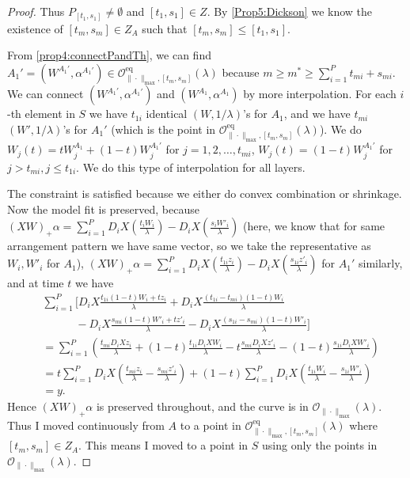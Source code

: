 \documentclass{article}
\newcommand{\eq}{\mathrm{eq}}      %
\begin{document}
\begin{proof}
Thus $P_{[t_1,s_1]} \neq \emptyset$ and $[t_1, s_1] \in Z$. By \cref{Prop5:Dickson} we know the existence of $[t_m, s_m] \in Z_A$ such that $[t_m, s_m] \leq [t_1, s_1]$. 

From \cref{prop4:connectPandTh}, we can find $A_1' = (W^{A_1'}, \alpha^{A_1'}) \in \mathcal{O}_{\|\cdot\|_{\max}, [t_m, s_m]}^{\eq}(\lambda)$ because $m \geq m^* \geq \sum_{i=1}^{P} t_{mi} + s_{mi}$. We can connect $(W^{A_1'},\alpha^{A_1'})$ and $(W^{A_1},\alpha^{A_1})$ by more interpolation.
For each $i$-th element in $S$ we have $t_{1i}$ identical $(W, 1/\lambda)$'s for $A_1$, and we have $t_{mi}$ $(W', 1/\lambda)$'s for $A_1'$ (which is the point in $\mathcal{O}_{\|\cdot\|_{\max}, [t_m, s_m]}^{\eq}(\lambda)$). We do
$W_j(t) = t W_j^{A_1} + (1-t) W_j^{A_1'}$ for $j = 1, 2, \dots, t_{mi}$, $W_j(t) = (1-t)W_j^{A_1'}$ for $j > t_{mi}, j \leq t_{1i}$.
We do this type of interpolation for all layers. 

The constraint is satisfied because we either do convex combination or shrinkage. Now the model fit is preserved, because $(XW)_{+}\alpha = \sum_{i=1}^P D_i X (\frac{t_i W_i}{\lambda}) - D_i X (\frac{s_i W'_i}{\lambda})$ (here, we know that for same arrangement pattern we have same vector, so we take the representative as $W_i, W'_i$ for $A_1$),
$(XW)_{+}\alpha = \sum_{i=1}^P D_i X (\frac{t_{1i} z_i}{\lambda}) - D_i X (\frac{s_{1i} z'_i}{\lambda})$ for $A_1'$ similarly, and at time $t$ we have
\begin{align*}
&\sum_{i=1}^P \Bigg[
    D_i X \frac{t_{1i}(1-t)W_i + t z_i}{\lambda}
    + D_i X \frac{(t_{1i}-t_{mi})(1-t)W_i}{\lambda} \\
&\qquad\quad
    - D_i X \frac{s_{mi}(1-t)W'_i + t z'_i}{\lambda}
    - D_i X \frac{(s_{1i}-s_{mi})(1-t)W'_i}{\lambda}
\Bigg] \\
&= \sum_{i=1}^P \left(
    \frac{t_{mi} D_i X z_i}{\lambda}
    + (1-t)\frac{t_{1i} D_i X W_i}{\lambda}
    - t\frac{s_{mi} D_i X z'_i}{\lambda}
    - (1-t)\frac{s_{1i} D_i X W'_i}{\lambda}
\right) \\
&= t \sum_{i=1}^P D_i X
    \left(\frac{t_{mi} z_i}{\lambda} - \frac{s_{mi} z'_i}{\lambda}\right)
    + (1-t) \sum_{i=1}^P D_i X
    \left(\frac{t_{1i} W_i}{\lambda} - \frac{s_{1i} W'_i}{\lambda}\right) \\
&= y.
\end{align*}
Hence $(XW)_{+}\alpha$ is preserved throughout, and the curve is in $\mathcal{O}_{\|\cdot\|_{\max}}(\lambda)$. Thus I moved continuously from $A$ to a point in $\mathcal{O}_{\|\cdot\|_{\max}, [t_m, s_m]}^{\eq}(\lambda)$ where $[t_m, s_m] \in Z_A$. This means I moved to a point in $S$ using only the points in $\mathcal{O}_{\|\cdot\|_{\max}}(\lambda)$.
\end{proof}
\end{document}

